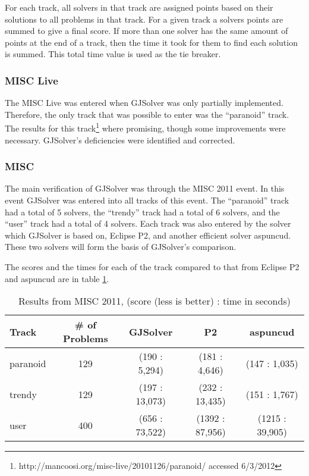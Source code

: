 For each track, all solvers in that track are assigned points based on their solutions to all problems in that track.
For a given track a solvers points are summed to give a final score.
If more than one solver has the same amount of points at the end of a track, then the time it took for them to find each solution is summed.
This total time value is used as the tie breaker.

\subsubsection{MISC Live}
The MISC Live was entered when GJSolver was only partially implemented.
Therefore, the only track that was possible to enter was the ``paranoid'' track.
The results for this track\footnote{http://mancoosi.org/misc-live/20101126/paranoid/ accessed 6/3/2012} where promising, though some improvements were necessary.
GJSolver's deficiencies were identified and corrected.

\subsubsection{MISC}
The main verification of GJSolver was through the MISC 2011 event.
In this event GJSolver was entered into all tracks of this event.
The ``paranoid'' track had a total of 5 solvers, the ``trendy'' track had a total of 6 solvers, 
and the ``user'' track had a total of 4 solvers.
Each track was also entered by the solver which GJSolver is based on, Eclipse P2, and another efficient solver aspuncud.
These two solvers will form the basis of GJSolver's comparison.

The scores and the times for each of the track compared to that from Eclipse P2 and aspuncud are in table \ref{impl.misc2011}.
\begin{table}[h!]
\begin{tabular}{| l | c | c | c | c |}\hline
Track & \# of Problems & GJSolver & P2 & aspuncud\\ \hline
paranoid & 129 & (190 : 5,294) & (181 : 4,646) & (147 : 1,035) \\ \hline
trendy & 129 & (197 : 13,073) & (232 : 13,435) & (151 : 1,767) \\ \hline
user & 400 & (656 : 73,522) & (1392 : 87,956) & (1215 : 39,905) \\ \hline
\end{tabular}
\caption{Results from MISC 2011, (score (less is better) : time in seconds)}
\label{impl.misc2011}
\end{table}

